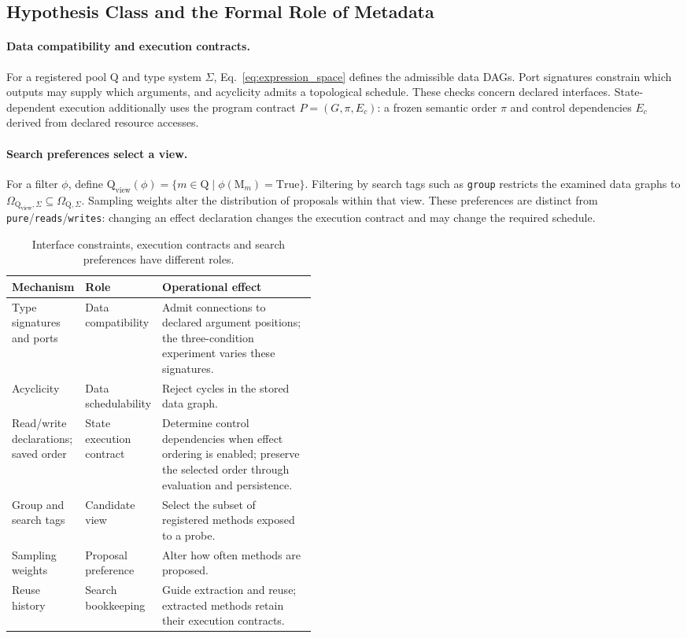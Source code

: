 \subsection{Hypothesis Class and the Formal Role of Metadata}
\label{app:metadata_role}

\paragraph{Data compatibility and execution contracts.}
For a registered pool $\mathrm{Q}$ and type system $\Sigma$, Eq.~\ref{eq:expression_space} defines the admissible data DAGs. Port signatures constrain which outputs may supply which arguments, and acyclicity admits a topological schedule. These checks concern declared interfaces. State-dependent execution additionally uses the program contract $P=(G,\pi,E_c)$: a frozen semantic order $\pi$ and control dependencies $E_c$ derived from declared resource accesses.

\paragraph{Search preferences select a view.}
For a filter $\phi$, define $\mathrm{Q}_{\mathrm{view}}(\phi)=\{m\in\mathrm{Q}\mid\phi(\mathrm{M}_m)=\mathrm{True}\}$. Filtering by search tags such as \texttt{group} restricts the examined data graphs to $\Omega_{\mathrm{Q}_{\mathrm{view}},\Sigma}\subseteq\Omega_{\mathrm{Q},\Sigma}$. Sampling weights alter the distribution of proposals within that view. These preferences are distinct from \texttt{pure}/\texttt{reads}/\texttt{writes}: changing an effect declaration changes the execution contract and may change the required schedule.

\begin{table}[htbp]
\centering\small
\caption{Interface constraints, execution contracts and search preferences have different roles.}
\label{tab:hard-soft}
\begin{tabularx}{\linewidth}{@{}p{0.23\linewidth}p{0.22\linewidth}X@{}}
\toprule
Mechanism & Role & Operational effect \\
\midrule
Type signatures and ports & Data compatibility & Admit connections to declared argument positions; the three-condition experiment varies these signatures. \\
Acyclicity & Data schedulability & Reject cycles in the stored data graph. \\
Read/write declarations; saved order & State execution contract & Determine control dependencies when effect ordering is enabled; preserve the selected order through evaluation and persistence. \\
Group and search tags & Candidate view & Select the subset of registered methods exposed to a probe. \\
Sampling weights & Proposal preference & Alter how often methods are proposed. \\
Reuse history & Search bookkeeping & Guide extraction and reuse; extracted methods retain their execution contracts. \\
\bottomrule
\end{tabularx}
\end{table}

